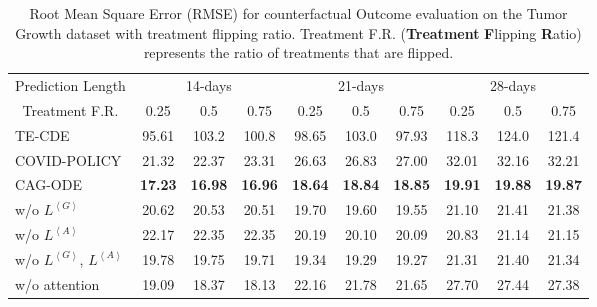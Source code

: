 \begin{table}[htbp]
\caption{Root Mean Square Error (RMSE) for counterfactual Outcome evaluation on the Tumor Growth dataset with treatment flipping ratio. Treatment F.R. (\textbf{Treatment} \textbf{F}lipping \textbf{R}atio) represents the ratio of treatments that are flipped.}
 \vspace{-1em}
\begin{tabular}{l|ccc|ccc|ccc}
\toprule
\multicolumn{1}{c|}{Prediction Length} & \multicolumn{3}{c|}{14-days} & \multicolumn{3}{c|}{21-days} & \multicolumn{3}{c}{28-days} \\
\multicolumn{1}{c|}{Treatment F.R.} & 0.25 & 0.5 & 0.75   & 0.25 & 0.5 & 0.75 & 0.25 & 0.5 & 0.75 \\ \hline
TE-CDE & 95.61 & 103.2 & 100.8 & 98.65 & 103.0 & 97.93 & 118.3 & 124.0 & 121.4 \\
COVID-POLICY & 21.32 & 22.37 & 23.31 & 26.63 & 26.83 & 27.00 & 32.01 & 32.16 & 32.21        \\ \hline
CAG-ODE & \textbf{17.23} & \textbf{16.98} & \textbf{16.96} & \textbf{18.64} & \textbf{18.84} & \textbf{18.85} & \textbf{19.91} & \textbf{19.88} & \textbf{19.87} \\
w/o $L^{\left< G \right>}$ & 20.62 & 20.53 & 20.51 & 19.70 & 19.60          & 19.55          & 21.10            & 21.41           & 21.38            \\
w/o $L^{\left< A \right>}$                       & 22.17          & 22.35          & 22.35          & 20.19          & 20.10          & 20.09          & 20.83            & 21.14           & 21.15            \\
w/o $L^{\left< G \right>}$, $L^{\left< A \right>}$                                 & 19.78          & 19.75          & 19.71          & 19.34          & 19.29          & 19.27          & 21.31        & 21.40       & 21.34        \\
w/o attention                                       & 19.09          & 18.37 & 18.13 & 22.16          & 21.78          & 21.65          & 27.70        & 27.44       & 27.38        \\ \bottomrule

\end{tabular}%
\medskip
\label{exp:flip_table}
\vspace{-1em}
\end{table}

